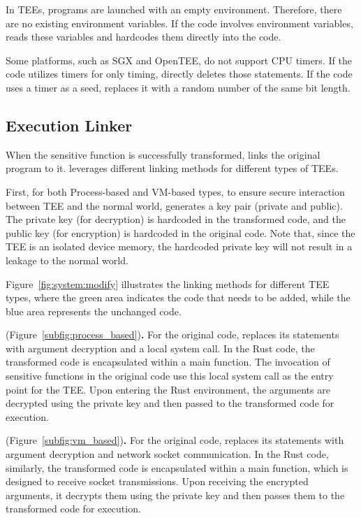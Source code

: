 \begin{description}[leftmargin=0pt]
\item [Environment variables.] 
In TEEs, programs are launched with an empty environment.
Therefore, there are no existing environment variables.
If the code involves environment variables, \system reads these variables and hardcodes them directly into the code.

\item [Timer.] 
Some platforms, such as SGX and OpenTEE, do not support CPU timers.
If the code utilizes timers for only timing, \system directly deletes those statements.
If the code uses a timer as a seed, \system replaces it with a random number of the same bit length.
\end{description}

\subsection{Execution Linker}
When the sensitive function is successfully transformed, \system links the original program to it.
\system leverages different linking methods for different types of TEEs.

First, for both Process-based and VM-based types, to ensure secure interaction between TEE and the normal world, \system generates a key pair (private and public).
The private key (for decryption) is hardcoded in the transformed code, and the public key (for encryption) is hardcoded in the original code.
Note that, since the TEE is an isolated device memory, the hardcoded private key will not result in a leakage to the normal world.

Figure~\ref{fig:system:modify} illustrates the linking methods for different TEE types, where the green area indicates the code that needs to be added, while the blue area represents the unchanged code.
\begin{description}[leftmargin=0pt]
\item [Process-based TEEs] (Figure~\ref{subfig:process_based})\textbf{.} 
For the original code, \system replaces its statements with argument decryption and a local system call.
In the Rust code, the transformed code is encapsulated within a main function.
The invocation of sensitive functions in the original code use this local system call as the entry point for the TEE.
Upon entering the Rust environment, the arguments are decrypted using the private key and then passed to the transformed code for execution.

\item [VM-based TEEs] (Figure~\ref{subfig:vm_based})\textbf{.} 
For the original code, \system replaces its statements with argument decryption and network socket communication.
In the Rust code, similarly, the transformed code is encapsulated within a main function, which is designed to receive socket transmissions. 
Upon receiving the encrypted arguments, it decrypts them using the private key and then passes them to the transformed code for execution.
\end{description}

